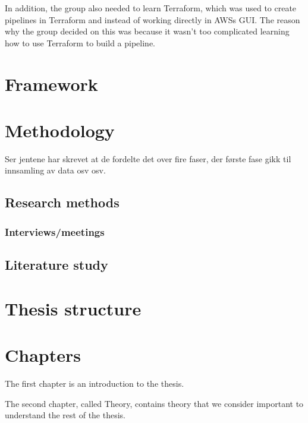 In addition, the group also needed to learn Terraform, which was used to create pipelines in Terraform and instead of working directly in AWSs \gls{GUI}. The reason why the group decided on this was because it wasn't too complicated learning how to use Terraform to build a pipeline. 



\section{Framework}

\section{Methodology} %
Ser jentene har skrevet at de fordelte det over fire faser, der første fase gikk til innsamling av data osv osv. 
\subsection{Research methods}
\subsubsection{Interviews/meetings}
\subsection{Literature study}

\section{Thesis structure}
\section{Chapters}
The first chapter is an introduction to the thesis.

The second chapter, called Theory, contains theory that we consider important to understand the rest of the thesis.



